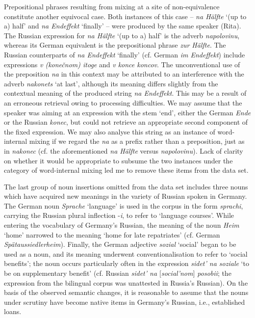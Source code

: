 Prepositional phrases resulting from mixing at a site of non-equivalence constitute another equivocal case. Both instances of this case -- \textit{na Hälfte} `(up to a) half' and \textit{na Endeffekt} `finally' -- were produced by the same speaker (Rita). The Russian expression for \textit{na Hälfte} `(up to a) half' is the adverb \textit{napolovinu}, whereas its German equivalent is the prepositional phrase \textit{zur Hälfte}. The Russian counterparts of \textit{na Endeffekt} `finally' (cf. German \textit{im Endeffekt}) include expressions \textit{v (konečnom) itoge} and \textit{v konce koncov}. The unconventional use of the preposition \textit{na} in this context may be attributed to an interference with the adverb \textit{nakonets} `at last', although its meaning differs slightly from the contextual meaning of the produced string \textit{na Endeffekt}. This may be a result of an erroneous retrieval owing to processing difficulties. We may assume that the speaker was aiming at an expression with the stem `end', either the German \textit{Ende} or the Russian \textit{konec}, but could not retrieve an appropriate second component of the fixed expression. We may also analyse this string as an instance of word-internal mixing if we regard the \textit{na} as a prefix rather than a preposition, just as in \textit{nakonec} (cf. the aforementioned \textit{na Hälfte} versus \textit{napolovinu}). Lack of clarity on whether it would be appropriate to subsume the two instances under the category of word-internal mixing led me to remove these items from the data set. 

The last group of noun insertions omitted from the data set includes three nouns which have acquired new meanings in the variety of Russian spoken in Germany. The German noun \textit{Sprache} `language' is used in the corpus in the form \textit{sprachi}, carrying the Russian plural inflection -\textit{i}, to refer to `language courses'. While entering the vocabulary of Germany's Russian, the meaning of the noun \textit{Heim} `home' narrowed to the meaning `home for late repatriates' (cf. German \textit{Spätaussiedlerheim}). Finally, the German adjective \textit{sozial} `social' began to be used as a noun, and its meaning underwent conventionalisation to refer to `social benefits'; the noun occurs particularly often in the expression \textit{sidet' na soziale} `to be on supplementary benefit' (cf. Russian \textit{sidet' na $[$social'nom$]$ posobii}; the expression from the bilingual corpus was unattested in Russia's  Russian). On the basis of the observed semantic changes, it is reasonable to assume that the nouns under scrutiny have become native items in Germany's Russian, i.e., established loans. 


